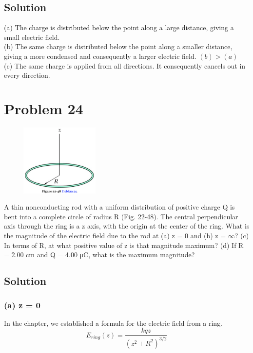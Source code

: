 \documentclass[12pt]{article}
\begin{document}
\subsection*{Solution}
(a) The charge is distributed below the point along a large distance, giving a small electric field.\\
(b) The same charge is distributed below the point along a smaller distance, giving a more condensed and consequently a larger electric field. $(b) > (a)$\\
(c) The same charge is applied from all directions. It consequently cancels out in every direction. 


\pagebreak
\section{Problem 24}
\begin{figure}
    \vspace{-30pt}
    \includegraphics[width=0.35\textwidth]{picture_5.png} 
\end{figure}
A thin nonconducting rod with a uniform distribution of positive charge Q is bent into a complete circle of radius R (Fig. 22-48). The central perpendicular axis through the ring is a z axis, with the origin at the center of the ring. What is the magnitude of the electric field due to the rod at (a) z = 0 and (b) z = $\infty$? (c) In terms of R, at what positive value of z is that magnitude maximum? (d) If R = 2.00 cm and Q = 4.00 \unit{\micro\coulomb}, what is the maximum magnitude?

\subsection*{Solution}
\subsubsection*{(a) z = 0}
In the chapter, we established a formula for the electric field from a ring.
\begin{equation*}
    E_{ring}(z) =   \frac{kqz}{(z^2 + R^2)^{3/2}}
\end{equation*}
\end{document}
